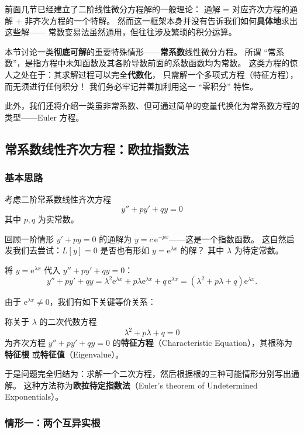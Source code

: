 \documentclass[lang=cn,11pt]{elegantbook}
\begin{document}
前面几节已经建立了二阶线性微分方程解的一般理论：
通解 = 对应齐次方程的通解 + 非齐次方程的一个特解。
然而这一框架本身并没有告诉我们如何\textbf{具体地}求出这些解——
常数变易法虽然通用，但往往涉及繁琐的积分运算。

本节讨论一类\textbf{彻底可解}的重要特殊情形——\textbf{常系数}线性微分方程。
所谓 ``常系数''，是指方程中未知函数及其各阶导数前面的系数函数均为常数。
这类方程的惊人之处在于：其求解过程可以完全\textbf{代数化}，
只需解一个多项式方程（特征方程），而无须进行任何积分！
我们务必牢记并善加利用这一 ``零积分'' 特性。

此外，我们还将介绍一类虽非常系数、但可通过简单的变量代换化为常系数方程的类型——Euler 方程。


\subsection{常系数线性齐次方程：欧拉指数法}


\subsubsection*{基本思路}

考虑二阶常系数线性齐次方程
\[
y''+py'+qy=0
\]
其中 $p,q$ 为实常数。

回顾一阶情形 $y'+py=0$ 的通解为 $y=c\,\mathrm{e}^{-px}$——这是一个指数函数。
这自然启发我们去尝试：$L[y]=0$ 是否也有形如 $y=\mathrm{e}^{\lambda x}$ 的解？
其中 $\lambda$ 为待定常数。

将 $y=\mathrm{e}^{\lambda x}$ 代入 $y''+py'+qy=0$：
\[
y''+py'+qy
=\lambda^{2}\mathrm{e}^{\lambda x}+p\lambda\mathrm{e}^{\lambda x}+q\,\mathrm{e}^{\lambda x}
=\left(\lambda^{2}+p\lambda+q\right)\mathrm{e}^{\lambda x}.
\]

由于 $\mathrm{e}^{\lambda x} \neq 0$，我们有如下关键等价关系：

\begin{definition}[特征方程与特征根] \label{def:characteristic-eq}
称关于 $\lambda$ 的二次代数方程
\[
\boxed{\;\lambda^{2}+p\lambda+q=0\;}
\]
为齐次方程 $y''+py'+qy=0$ 的\textbf{特征方程}（Characteristic Equation），其根称为\textbf{特征根}
或\textbf{特征值}（Eigenvalue）。
\end{definition}

于是问题完全归结为：求解一个二次方程，然后根据根的三种可能情形分别写出通解。
这种方法称为\textbf{欧拉待定指数法}（Euler's theorem of Undetermined Exponentials）。


\subsubsection*{情形一：两个互异实根}
\end{document}
